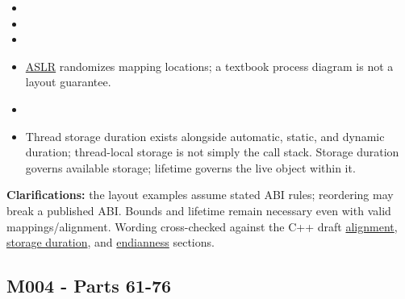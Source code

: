 \hypertarget{appendix-fd090d982a15-bridges-and-distinctions-that-must-not-be-omitted}{}

\begin{itemize}
\tightlist
\item
\item
\item
\item
  \hyperref[appendix-78cb248c8355]{ASLR} randomizes mapping locations; a textbook process diagram is not a layout guarantee.
\item
\item
  Thread storage duration exists alongside automatic, static, and dynamic duration; thread-local storage is not simply the call stack. Storage duration governs available storage; lifetime governs the live object within it.
\end{itemize}

\textbf{Clarifications:} the layout examples assume stated ABI rules; reordering may break a published ABI. Bounds and lifetime remain necessary even with valid mappings/alignment. Wording cross-checked against the C++ draft \href{https://eel.is/c++draft/basic.align}{alignment}, \href{https://eel.is/c++draft/basic.stc}{storage duration}, and \href{https://eel.is/c++draft/bit.endian}{endianness} sections.

\subsection{M004 - Parts 61-76}\label{appendix-fd090d982a15-m004---parts-61-76}

\hypertarget{appendix-fd090d982a15-m004---parts-61-76}{}

